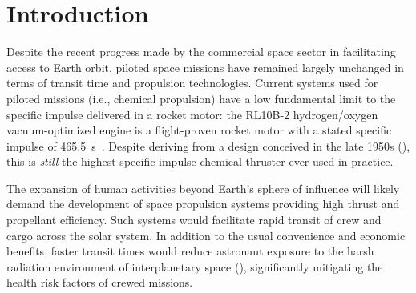 \chapter{Introduction} \label{chp:intro}
    Despite the recent progress made by the commercial space sector in facilitating access to Earth orbit, piloted space missions have remained largely unchanged in terms of transit time and propulsion technologies. Current systems used for piloted missions (i.e., chemical propulsion) have a low fundamental limit to the specific impulse delivered in a rocket motor: the RL10B-2 hydrogen/oxygen vacuum-optimized engine is a flight-proven rocket motor with a stated specific impulse of \qty{465.5}{s}~\cite{l3harrisRL10Engine2023}. Despite deriving from a design conceived in the late 1950s (\textcite{bilsteinFireSmokeThunder1996}), this is \emph{still} the highest specific impulse chemical thruster ever used in practice.
    
    The expansion of human activities beyond Earth's sphere of influence will likely demand the development of space propulsion systems providing high thrust and propellant efficiency. Such systems would facilitate rapid transit of crew and cargo across the solar system. In addition to the usual convenience and economic benefits, faster transit times would reduce astronaut exposure to the harsh radiation environment of interplanetary space (\textcite{bergerLongTermVariations2020}), significantly mitigating the health risk factors of crewed missions.

